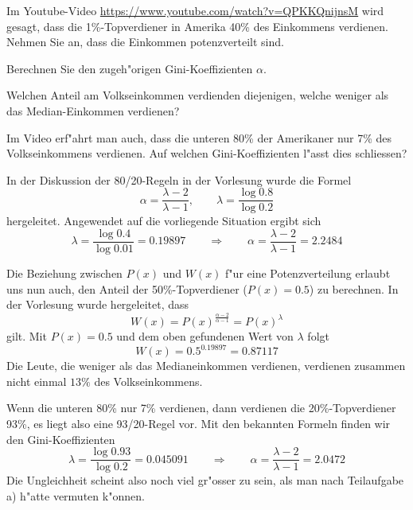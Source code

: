Im Youtube-Video \url{https://www.youtube.com/watch?v=QPKKQnijnsM} wird
gesagt, dass die 1\%-Topverdiener in Amerika 40\% des Einkommens
verdienen. Nehmen Sie an, dass die Einkommen potenzverteilt sind.
\begin{teilaufgaben}
\item
Berechnen Sie den zugeh"origen Gini-Koeffizienten $\alpha$.
\item
Welchen Anteil am Volkseinkommen verdienden diejenigen, welche
weniger als das Median-Einkommen verdienen?
\item
Im Video erf"ahrt man auch, dass die unteren 80\% der Amerikaner nur
7\% des Volkseinkommens verdienen. 
Auf welchen Gini-Koeffizienten l"asst dies schliessen?
\end{teilaufgaben}

\begin{loesung}
\begin{teilaufgaben}
\item
In der Diskussion der 80/20-Regeln in der Vorlesung wurde die Formel
\[
\alpha=\frac{\lambda-2}{\lambda-1},\qquad \lambda=\frac{\log 0.8}{\log 0.2}
\]
hergeleitet. Angewendet auf die vorliegende Situation ergibt sich
\[
\lambda=\frac{\log 0.4}{\log 0.01}=0.19897
\qquad
\Rightarrow
\qquad
\alpha=\frac{\lambda - 2}{\lambda - 1}=2.2484
\]
\item
Die Beziehung zwischen $P(x)$ und $W(x)$ f"ur eine Potenzverteilung erlaubt
uns nun auch, den Anteil der 50\%-Topverdiener ($P(x)=0.5$) zu berechnen.
In der Vorlesung wurde hergeleitet, dass 
\[
W(x)=P(x)^\frac{\alpha - 2}{\alpha - 1}=P(x)^\lambda
\]
gilt. Mit $P(x)=0.5$ und dem oben gefundenen Wert von $\lambda$
folgt
\[
W(x)=0.5^{0.19897}=0.87117
\]
Die Leute, die weniger als das Medianeinkommen verdienen, verdienen zusammen
nicht einmal $13\%$ des Volkseinkommens.
\item
Wenn die unteren 80\% nur 7\% verdienen, dann verdienen die 20\%-Topverdiener
93\%, es liegt also eine 93/20-Regel vor. Mit den bekannten Formeln finden
wir den Gini-Koeffizienten
\[
\lambda=\frac{\log 0.93}{\log 0.2}=0.045091
\qquad\Rightarrow\qquad
\alpha=\frac{\lambda - 2}{\lambda - 1}=2.0472
\]
Die Ungleichheit scheint also noch viel gr"osser zu sein, als
man nach Teilaufgabe a) h"atte vermuten k"onnen.
\end{teilaufgaben}
\end{loesung}

